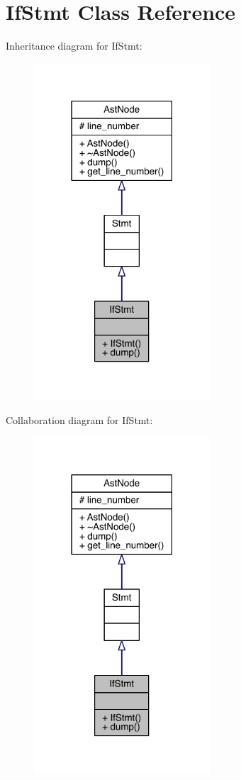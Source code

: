 \hypertarget{class_if_stmt}{}\section{If\+Stmt Class Reference}
\label{class_if_stmt}


Inheritance diagram for If\+Stmt\+:\nopagebreak
\begin{figure}[H]
\begin{center}
\leavevmode
\includegraphics[width=186pt]{class_if_stmt__inherit__graph}
\end{center}
\end{figure}


Collaboration diagram for If\+Stmt\+:\nopagebreak
\begin{figure}[H]
\begin{center}
\leavevmode
\includegraphics[width=186pt]{class_if_stmt__coll__graph}
\end{center}
\end{figure}
